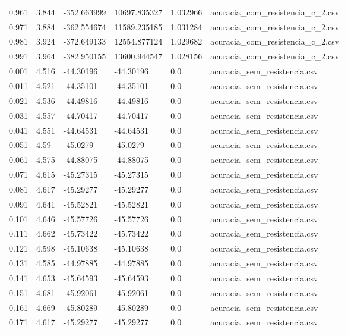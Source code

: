 \begin{table}
\begin{tabular}{llllll}
0.961 & 3.844 & -352.663999 & 10697.835327 & 1.032966 & acuracia\_com\_resistencia\_c\_2.csv \\
0.971 & 3.884 & -362.554674 & 11589.235185 & 1.031284 & acuracia\_com\_resistencia\_c\_2.csv \\
0.981 & 3.924 & -372.649133 & 12554.877124 & 1.029682 & acuracia\_com\_resistencia\_c\_2.csv \\
0.991 & 3.964 & -382.950155 & 13600.944547 & 1.028156 & acuracia\_com\_resistencia\_c\_2.csv \\
0.001 & 4.516 & -44.30196 & -44.30196 & 0.0 & acuracia\_sem\_resistencia.csv \\
0.011 & 4.521 & -44.35101 & -44.35101 & 0.0 & acuracia\_sem\_resistencia.csv \\
0.021 & 4.536 & -44.49816 & -44.49816 & 0.0 & acuracia\_sem\_resistencia.csv \\
0.031 & 4.557 & -44.70417 & -44.70417 & 0.0 & acuracia\_sem\_resistencia.csv \\
0.041 & 4.551 & -44.64531 & -44.64531 & 0.0 & acuracia\_sem\_resistencia.csv \\
0.051 & 4.59 & -45.0279 & -45.0279 & 0.0 & acuracia\_sem\_resistencia.csv \\
0.061 & 4.575 & -44.88075 & -44.88075 & 0.0 & acuracia\_sem\_resistencia.csv \\
0.071 & 4.615 & -45.27315 & -45.27315 & 0.0 & acuracia\_sem\_resistencia.csv \\
0.081 & 4.617 & -45.29277 & -45.29277 & 0.0 & acuracia\_sem\_resistencia.csv \\
0.091 & 4.641 & -45.52821 & -45.52821 & 0.0 & acuracia\_sem\_resistencia.csv \\
0.101 & 4.646 & -45.57726 & -45.57726 & 0.0 & acuracia\_sem\_resistencia.csv \\
0.111 & 4.662 & -45.73422 & -45.73422 & 0.0 & acuracia\_sem\_resistencia.csv \\
0.121 & 4.598 & -45.10638 & -45.10638 & 0.0 & acuracia\_sem\_resistencia.csv \\
0.131 & 4.585 & -44.97885 & -44.97885 & 0.0 & acuracia\_sem\_resistencia.csv \\
0.141 & 4.653 & -45.64593 & -45.64593 & 0.0 & acuracia\_sem\_resistencia.csv \\
0.151 & 4.681 & -45.92061 & -45.92061 & 0.0 & acuracia\_sem\_resistencia.csv \\
0.161 & 4.669 & -45.80289 & -45.80289 & 0.0 & acuracia\_sem\_resistencia.csv \\
0.171 & 4.617 & -45.29277 & -45.29277 & 0.0 & acuracia\_sem\_resistencia.csv \\

\end{tabular}
\end{table}
